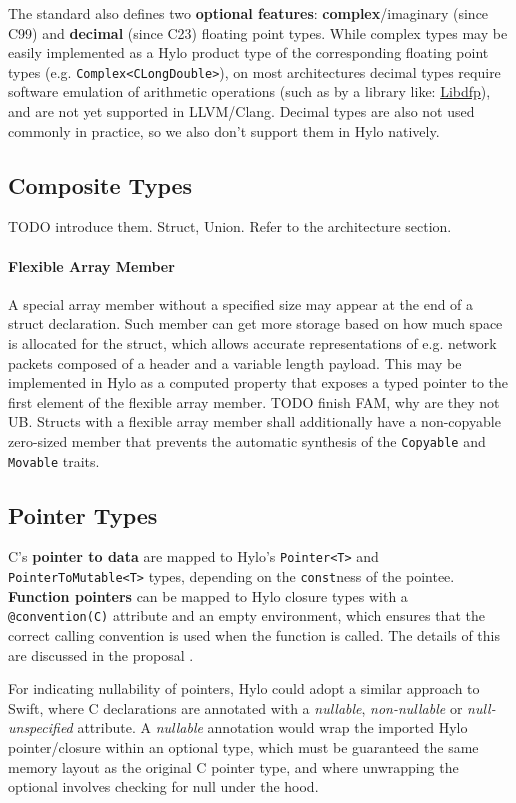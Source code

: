 The standard also defines two \textbf{optional features}: \textbf{complex}/imaginary (since C99) and \textbf{decimal} (since C23) floating point types. While complex types may be easily implemented as a Hylo product type of the corresponding floating point types (e.g. \texttt{Complex<CLongDouble>}), on most architectures decimal types require software emulation of arithmetic operations (such as by a library like: \href{https://github.com/libdfp/libdfp}{Libdfp}), and are not yet supported in LLVM/Clang\cite{no-support-llvm-decimals}. Decimal types are also not used commonly in practice, so we also don't support them in Hylo natively.

\subsection{Composite Types}
TODO introduce them. Struct, Union. Refer to the architecture section.

\paragraph{
Flexible Array Member
    }
    \label{par:fam}
    A special array member without a specified size may appear at the end of a struct declaration. Such member can get more storage based on how much space is allocated for the struct, which allows accurate representations of e.g. network packets composed of a header and a variable length payload. This may be implemented in Hylo as a computed property that exposes a typed pointer to the first element of the flexible array member. TODO finish FAM, why are they not UB. Structs with a flexible array member shall additionally have a non-copyable zero-sized member that prevents the automatic synthesis of the \texttt{Copyable} and \texttt{Movable} traits.

\subsection{Pointer Types}
C's \textbf{pointer to data} are mapped to Hylo's \texttt{Pointer<T>} and \texttt{PointerToMutable<T>} types, depending on the \texttt{const}ness of the pointee. \textbf{Function pointers} can be mapped to Hylo closure types with a \texttt{@convention(C)} attribute and an empty environment, which ensures that the correct calling convention is used when the function is called. The details of this are discussed in the proposal \cite{hylo-function-pointers}.

For indicating nullability of pointers, Hylo could adopt a similar approach to Swift\cite{how-swift-imports-c-nullable}, where C declarations are annotated with a \textit{nullable}, \textit{non-nullable} or \textit{null-unspecified} attribute. A \textit{nullable} annotation would wrap the imported Hylo pointer/closure within an optional type, which must be guaranteed the same memory layout as the original C pointer type, and where unwrapping the optional involves checking for null under the hood.

